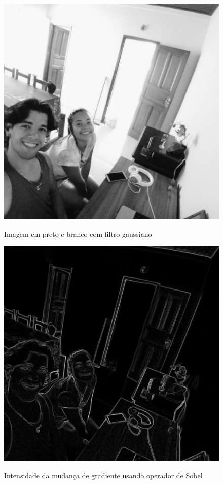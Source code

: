 \begin{figure}[!htb]
	\centering
    \caption{Imagem em preto e branco com filtro gaussiano}
	\includegraphics[scale=0.25]{figuras/filter/sobel/f_normal.jpeg}
	\label{fig:Imagem em preto e branco com filtro de gaus}
\end{figure}

\begin{figure}[!htb]
	\centering
    \caption{Intensidade da mudança de gradiente usando operador de Sobel}
	\includegraphics[scale=0.25]{figuras/filter/sobel/f_sobel.jpeg}
	\label{fig:Intensidade da mudanca de gradiente}
\end{figure}



